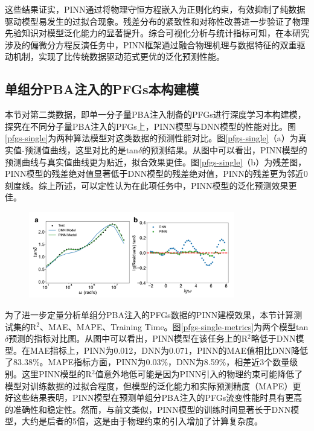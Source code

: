 这些结果证实，PINN通过将物理守恒方程嵌入为正则化约束，有效抑制了纯数据驱动模型易发生的过拟合现象。残差分布的紧致性和对称性改善进一步验证了物理先验知识对模型泛化能力的显著提升。综合可视化分析与统计指标可知，在本研究涉及的偏微分方程反演任务中，PINN框架通过融合物理机理与数据特征的双重驱动机制，实现了比传统数据驱动范式更优的泛化预测性能。
\subsection{单组分PBA注入的PFGs本构建模}
本节对第二类数据，即单一分子量PBA注入制备的PFGs进行深度学习本构建模，探究在不同分子量PBA注入的PFGs上，PINN模型与DNN模型的性能对比。图\ref{pfgs-single}为两种算法模型对这类数据的预测性能对比。图\ref{pfgs-single}（a）为真实值-预测值曲线，这里对比的是tan$\delta$的预测结果。从图中可以看出，PINN模型的预测曲线与真实值曲线更为贴近，拟合效果更佳。图\ref{pfgs-single}（b）为残差图，PINN模型的残差绝对值显著低于DNN模型的残差绝对值，PINN的残差更为邻近0刻度线。综上所述，可以定性认为在此项任务中，PINN模型的泛化预测效果更佳。
\begin{figure}[htbp]
  \centering
  \includegraphics[width=0.8\textwidth]{Fig/pfgs-single.pdf}
\end{figure}
为了进一步定量分析单组分PBA注入的PFGs数据的PINN建模效果，本节计算测试集的R$^2$、MAE、MAPE、Training Time。图\ref{pfgs-single-metrics}为两个模型tan$\delta$预测的指标对比图。从图中可以看出，PINN模型在该任务上的R$^2$略低于DNN模型。在MAE指标上，PINN为0.012，DNN为0.071，PINN的MAE值相比DNN降低了83.38\%。MAPE指标方面，PINN为0.03\%，DNN为8.59\%，相差近3个数量级别。这里PINN模型的R$^2$值意外地低可能是因为PINN引入的物理约束可能降低了模型对训练数据的过拟合程度，但模型的泛化能力和实际预测精度（MAPE）更好这些结果表明，PINN模型在预测单组分PBA注入的PFGs流变性能时具有更高的准确性和稳定性。然而，与前文类似，PINN模型的训练时间显著长于DNN模型，大约是后者的5倍，这是由于物理约束的引入增加了计算复杂度。
